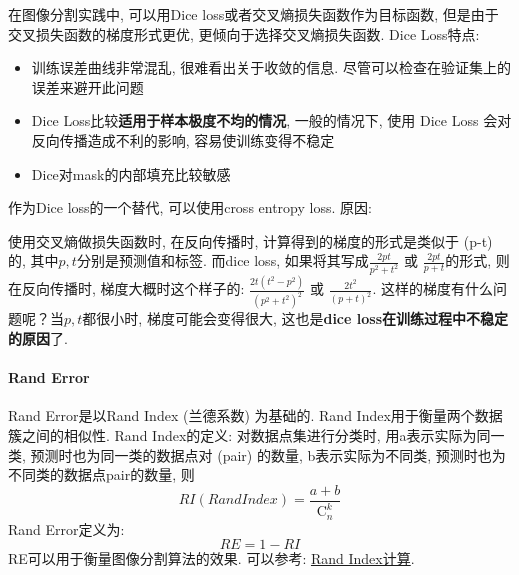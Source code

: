 在图像分割实践中, 可以用Dice loss或者交叉熵损失函数作为目标函数, 但是由于交叉损失函数的梯度形式更优, 更倾向于选择交叉熵损失函数. 
Dice Loss特点: 
\begin{itemize}
	\item 训练误差曲线非常混乱, 很难看出关于收敛的信息. 尽管可以检查在验证集上的误差来避开此问题
	\item Dice Loss比较\textbf{适用于样本极度不均的情况}, 一般的情况下, 使用 Dice Loss 会对反向传播造成不利的影响, 容易使训练变得不稳定
	\item Dice对mask的内部填充比较敏感
	
\end{itemize}
作为Dice loss的一个替代, 可以使用cross entropy loss. 原因: 
\begin{center}
	使用交叉熵做损失函数时, 在反向传播时, 计算得到的梯度的形式是类似于 (p-t) 的, 其中$p, t$分别是预测值和标签. 而dice loss, 如果将其写成$\frac{2pt}{p^2+t^2}$ 或 $\frac{2pt}{p+t}$的形式, 则在反向传播时, 梯度大概时这个样子的:  $\frac{2t(t^2-p^2)}{(p^2+t^2)^2}$ 或 $\frac{2t^2}{(p+t)^2}$. 这样的梯度有什么问题呢？当$p, t$都很小时, 梯度可能会变得很大, 这也是\textbf{dice loss在训练过程中不稳定的原因}了. 
\end{center}



\paragraph{Rand Error}
Rand Error是以Rand Index (兰德系数) 为基础的. Rand Index用于衡量两个数据簇之间的相似性. Rand Index的定义: 
对数据点集进行分类时, 用a表示实际为同一类, 预测时也为同一类的数据点对 (pair) 的数量, b表示实际为不同类, 预测时也为不同类的数据点pair的数量, 则
$$
RI(Rand Index) = \frac{a + b}{\mathrm{C}_n^k}
$$
Rand Error定义为: 
$$
RE = 1 - RI
$$
RE可以用于衡量图像分割算法的效果. 可以参考: \href{http://www.otlet-institute.org/wikics/Clustering_Problems.html#toc-Subsection-4.1}{Rand Index计算}. 

